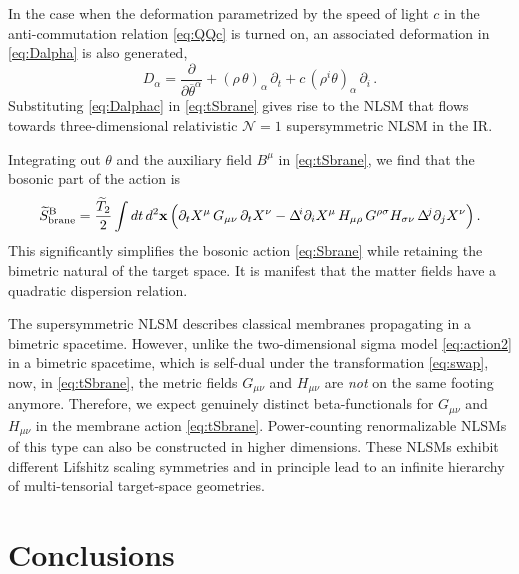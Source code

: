 \documentclass[11pt]{article}
\newcommand{\be}{\begin{equation}}
\newcommand{\ee}{\end{equation}}
\newcommand{\CN}{\mathcal{N}}
\newcommand{\p}{\partial}
\renewcommand{\tilde}[1]{\widetilde{#1}}
\begin{document}
In the case when the deformation parametrized by the speed of light $c$ in the anti-commutation relation \eqref{eq:QQc} is turned on, an associated deformation in \eqref{eq:Dalpha} is also generated,
%
\be \label{eq:Dalphac}
	D_\alpha = \frac{\p}{\p \overline{\theta}^\alpha} + (\rho \, \theta)_\alpha \, \p_t + c \, (\rho^i \theta)_\alpha \, \p_i\,.
\ee
%
Substituting \eqref{eq:Dalphac} in \eqref{eq:tSbrane} gives rise to the NLSM that flows towards three-dimensional relativistic $\CN=1$ supersymmetric NLSM in the IR.

Integrating out $\theta$ and the auxiliary field $B^\mu$ in \eqref{eq:tSbrane}, we find that the bosonic part of the action is
%
\be \label{eq:bosonicpart}
	\tilde{S}^{\text{B}}_\text{brane} = \frac{\tilde{T}_2}{2} \int dt \, d^2 \mathbf{x} \, \Bigl( \p_t X^\mu \, G_{\mu\nu} \, \p_t X^\nu - \Delta^{\!i} \p_i X^\mu \, H_{\mu\rho} \, G^{\rho\sigma}  H_{\sigma\nu} \, \Delta^{\!j} \p_j X^\nu \Bigr)\,.
\ee
%
This significantly simplifies the bosonic action \eqref{eq:Sbrane} while retaining the bimetric natural of the target space. It is manifest that the matter fields have a quadratic dispersion relation. 

The supersymmetric NLSM describes classical membranes propagating in a bimetric spacetime. However, unlike the two-dimensional sigma model \eqref{eq:action2} in a bimetric spacetime, which is self-dual under the transformation \eqref{eq:swap}, now, in \eqref{eq:tSbrane}, the metric fields $G_{\mu\nu}$ and $H_{\mu\nu}$ are \emph{not} on the same footing anymore. Therefore, we expect genuinely distinct beta-functionals for $G_{\mu\nu}$ and $H_{\mu\nu}$ in the membrane action \eqref{eq:tSbrane}. Power-counting renormalizable NLSMs of this type can also be constructed in higher dimensions. These NLSMs exhibit different Lifshitz scaling symmetries and in principle lead to an infinite hierarchy of multi-tensorial target-space geometries.

\section{Conclusions} \label{sec:concl}
\end{document}
